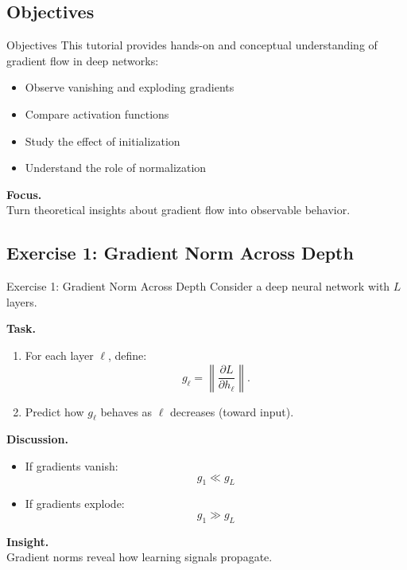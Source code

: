 \documentclass[aspectratio=169,11pt]{beamer}
\begin{document}
\subsection{Objectives}
\begin{frame}[t,allowframebreaks]{Objectives}
\small
This tutorial provides hands-on and conceptual understanding of gradient flow in deep networks:

\begin{itemize}
    \item Observe vanishing and exploding gradients
    \item Compare activation functions
    \item Study the effect of initialization
    \item Understand the role of normalization
\end{itemize}

\textbf{Focus.}\\ Turn theoretical insights about gradient flow into observable behavior.
\end{frame}

\subsection{Exercise 1: Gradient Norm Across Depth}
\begin{frame}[t,allowframebreaks]{Exercise 1: Gradient Norm Across Depth}
\small
Consider a deep neural network with $L$ layers.

\textbf{Task.}\\ \begin{enumerate}
    \item For each layer $\ell$, define:
    \[
    g_\ell = \left\|\frac{\partial L}{\partial h_\ell}\right\|.
    \]
    \item Predict how $g_\ell$ behaves as $\ell$ decreases (toward input).
\end{enumerate}

\textbf{Discussion.}\\ \begin{itemize}
    \item If gradients vanish:
    \[
    g_1 \ll g_L
    \]

    \item If gradients explode:
    \[
    g_1 \gg g_L
    \]
\end{itemize}

\textbf{Insight.}\\ Gradient norms reveal how learning signals propagate.
\end{frame}
\end{document}
